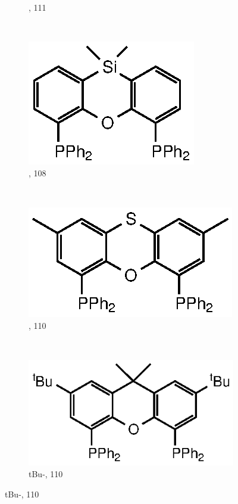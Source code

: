 \begin{figure}[htbp]
\begin{subfigure}[b]{0.35\textwidth}
	\caption{\Phxantphos, 111\degrees}
	\label{Phxantphos}
\end{subfigure}
~
\begin{subfigure}[b]{0.3\textwidth}
	\centering
	\includegraphics{../Figures/Xantphosderivatives/Sixantphos.eps}
	\caption{\Phsixantphos, 108\degrees}
	\label{Phsixantphos}
\end{subfigure}
~
\begin{subfigure}[b]{0.3\textwidth}
	\centering
	\includegraphics{../Figures/Xantphosderivatives/Phthixantphos.eps}
	\caption{\Phthixantphos, 110\degrees}
	\label{Phthixantphos}
\end{subfigure}
\\
\vspace{0.5cm}
\begin{subfigure}[b]{0.35\textwidth}
	\centering
	\includegraphics{../Figures/Xantphosderivatives/tBu-Phxantphos.eps}
	\caption{tBu-\Phxantphos, 110\degrees}
	\label{tBuPhxantphos}
\end{subfigure}

\end{figure}
